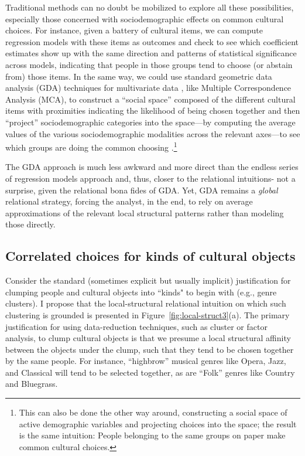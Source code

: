 \documentclass[preprint,12pt,authoryear]{elsarticle}
\begin{document}
Traditional methods can no doubt be mobilized to explore all these possibilities, especially those concerned with sociodemographic effects on common cultural choices. For instance, given a battery of cultural items, we can compute regression models with these items as outcomes and check to see which coefficient estimates show up with the same direction and patterns of statistical significance across models, indicating that people in those groups tend to choose (or abstain from) those items. In the same way, we could use standard geometric data analysis (GDA) techniques for multivariate data \citep{le2004geometric}, like Multiple Correspondence Analysis (MCA), to construct a ``social space'' composed of the different cultural items with proximities indicating the likelihood of being chosen together and then ``project'' sociodemographic categories into the space---by computing the average values of the various sociodemographic modalities across the relevant axes---to see which groups are doing the common choosing \citep{flemmen2018social, le2008class}.\footnote{This can also be done the other way around, constructing a social space of active demographic variables and projecting choices into the space; the result is the same intuition: People belonging to the same groups on paper make common cultural choices.} 

The GDA approach is much less awkward and more direct than the endless series of regression models approach and, thus, closer to the relational intuitions- not a surprise, given the relational bona fides of GDA. Yet, GDA remains a \textit{global} relational strategy, forcing the analyst, in the end, to rely on average approximations of the relevant local structural patterns rather than modeling those directly.

\subsection{Correlated choices for kinds of cultural objects}
Consider the standard (sometimes explicit but usually implicit) justification for clumping people and cultural objects into ``kinds" to begin with (e.g., genre clusters). I propose that the local-structural relational intuition on which such clustering is grounded is presented in Figure~\ref{fig:local-struct3}(a). The primary justification for using data-reduction techniques, such as cluster or factor analysis, to clump cultural objects is that we presume a local structural affinity between the objects under the clump, such that they tend to be chosen together by the same people. For instance, ``highbrow'' musical genres like Opera, Jazz, and Classical will tend to be selected together, as are ``Folk'' genres like Country and Bluegrass. 
\end{document}
